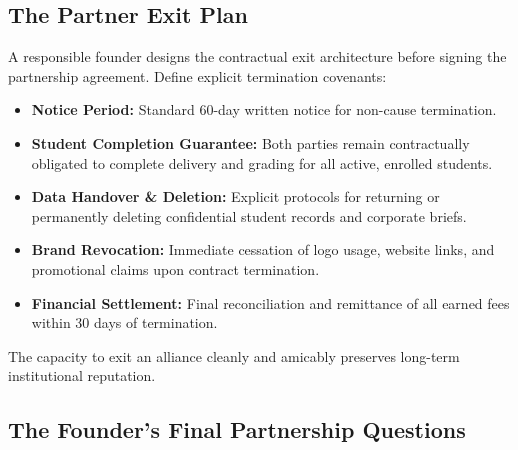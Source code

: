 \subsection{The Partner Exit Plan}
\label{sec:partner_exit_plan}

A responsible founder designs the contractual exit architecture before signing the partnership agreement. Define explicit termination covenants:
\begin{itemize}
\item \textbf{Notice Period:} Standard 60-day written notice for non-cause termination.
\item \textbf{Student Completion Guarantee:} Both parties remain contractually obligated to complete delivery and grading for all active, enrolled students.
\item \textbf{Data Handover \& Deletion:} Explicit protocols for returning or permanently deleting confidential student records and corporate briefs.
\item \textbf{Brand Revocation:} Immediate cessation of logo usage, website links, and promotional claims upon contract termination.
\item \textbf{Financial Settlement:} Final reconciliation and remittance of all earned fees within 30 days of termination.
\end{itemize}
The capacity to exit an alliance cleanly and amicably preserves long-term institutional reputation.

\subsection{The Founder's Final Partnership Questions}
\label{sec:founders_final_partnership_questions}

